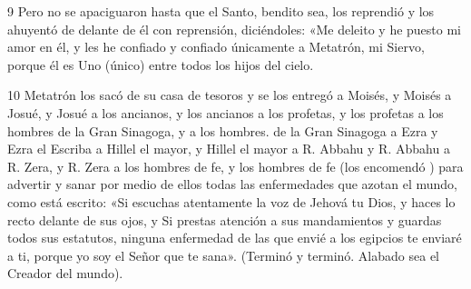 \par 9 Pero no se apaciguaron hasta que el Santo, bendito sea, los reprendió y los ahuyentó de delante de él con reprensión, diciéndoles: «Me deleito y he puesto mi amor en él, y les he confiado y confiado únicamente a Metatrón, mi Siervo, porque él es Uno (único) entre todos los hijos del cielo.

\par 10 Metatrón los sacó de su casa de tesoros y se los entregó a Moisés, y Moisés a Josué, y Josué a los ancianos, y los ancianos a los profetas, y los profetas a los hombres de la Gran Sinagoga, y a los hombres. de la Gran Sinagoga a Ezra y Ezra el Escriba a Hillel el mayor, y Hillel el mayor a R. Abbahu y R. Abbahu a R. Zera, y R. Zera a los hombres de fe, y los hombres de fe (los encomendó ) para advertir y sanar por medio de ellos todas las enfermedades que azotan el mundo, como está escrito: «Si escuchas atentamente la voz de Jehová tu Dios, y haces lo recto delante de sus ojos, y Si prestas atención a sus mandamientos y guardas todos sus estatutos, ninguna enfermedad de las que envié a los egipcios te enviaré a ti, porque yo soy el Señor que te sana». (Terminó y terminó. Alabado sea el Creador del mundo).




